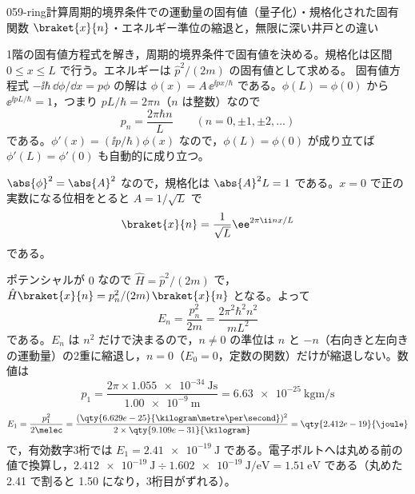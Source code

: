 \documentclass[uplatex,dvipdfmx,a4paper,11pt]{jsarticle}
\begin{document}
\begin{mondai}{059-ring}{計算}{周期的境界条件での運動量の固有値（量子化）・規格化された固有関数 $\braket{x}{n}$・エネルギー準位の縮退と，無限に深い井戸との違い}
\begin{kizuki}
\end{kizuki}
\begin{tadashii}
\houshin 1階の固有値方程式を解き，周期的境界条件で固有値を決める。規格化は区間 $0\le x\le L$ で行う。エネルギーは $\hat{p}^{2}/(2m)$ の固有値として求める。
\keisan {} 固有値方程式 $-\ii\hbar\,\dd\phi/\dd x=p\phi$ の解は $\phi(x)=A\,\ee^{\ii px/\hbar}$ である。$\phi(L)=\phi(0)$ から $\ee^{\ii pL/\hbar}=1$，つまり $pL/\hbar=2\pi n$（$n$ は整数）なので
\[ p_{n}=\frac{2\pi\hbar n}{L}\qquad(n=0,\pm1,\pm2,\ldots) \]
である。$\phi'(x)=(\ii p/\hbar)\phi(x)$ なので，$\phi(L)=\phi(0)$ が成り立てば $\phi'(L)=\phi'(0)$ も自動的に成り立つ。

 $\abs{\phi}^{2}=\abs{A}^{2}$ なので，規格化は $\abs{A}^{2}L=1$ である。$x=0$ で正の実数になる位相をとると $A=1/\sqrt{L}$ で
\[ \braket{x}{n}=\frac{1}{\sqrt{L}}\ee^{2\pi\ii nx/L} \]
である。

 ポテンシャルが $0$ なので $\hat{H}=\hat{p}^{2}/(2m)$ で，$\hat{H}\braket{x}{n}=p_{n}^{2}/(2m)\,\braket{x}{n}$ となる。よって
\[ E_{n}=\frac{p_{n}^{2}}{2m}=\frac{2\pi^{2}\hbar^{2}n^{2}}{mL^{2}} \]
である。$E_{n}$ は $n^{2}$ だけで決まるので，$n\neq0$ の準位は $n$ と $-n$（右向きと左向きの運動量）の2重に縮退し，$n=0$（$E_{0}=0$，定数の関数）だけが縮退しない。数値は
\[ p_{1}=\frac{2\pi\times\qty{1.055e-34}{\joule\second}}{\qty{1.00e-9}{\metre}}=\qty{6.63e-25}{\kilogram\metre\per\second} \]
\[ E_{1}=\frac{p_{1}^{2}}{2\melec}=\frac{(\qty{6.629e-25}{\kilogram\metre\per\second})^{2}}{2\times\qty{9.109e-31}{\kilogram}}=\qty{2.412e-19}{\joule} \]
で，有効数字3桁では $E_{1}=\qty{2.41e-19}{\joule}$ である。電子ボルトへは丸める前の値で換算し，$\qty{2.412e-19}{\joule}\div\qty{1.602e-19}{\joule\per\electronvolt}=\qty{1.51}{\electronvolt}$ である（丸めた \num{2.41} で割ると \num{1.50} になり，3桁目がずれる）。


\end{tadashii}
\end{mondai}
\end{document}
